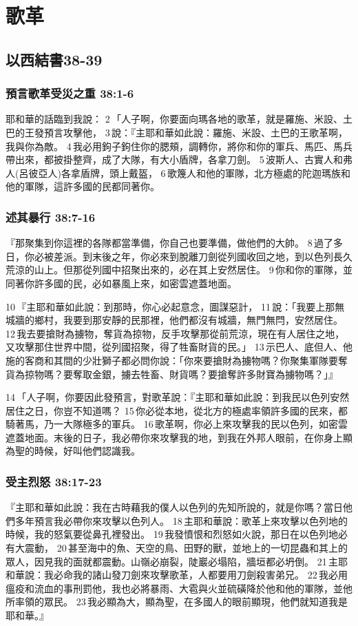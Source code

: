 \section{歌革}
\subsection{以西結書38-39}
\subsubsection{預言歌革受災之重 38:1-6}
耶和華的話臨到我說： 2 「人子啊，你要面向瑪各地的歌革，就是羅施、米設、土巴的王發預言攻擊他， 3 說：『主耶和華如此說：羅施、米設、土巴的王歌革啊，我與你為敵。 4 我必用鉤子鉤住你的腮頰，調轉你，將你和你的軍兵、馬匹、馬兵帶出來，都披掛整齊，成了大隊，有大小盾牌，各拿刀劍。 5 波斯人、古實人和弗人(呂彼亞人)各拿盾牌，頭上戴盔， 6 歌篾人和他的軍隊，北方極處的陀迦瑪族和他的軍隊，這許多國的民都同著你。

\subsubsection{述其暴行 38:7-16}
『那聚集到你這裡的各隊都當準備，你自己也要準備，做他們的大帥。 8 過了多日，你必被差派。到末後之年，你必來到脫離刀劍從列國收回之地，到以色列長久荒涼的山上。但那從列國中招聚出來的，必在其上安然居住。 9 你和你的軍隊，並同著你許多國的民，必如暴風上來，如密雲遮蓋地面。

10 『主耶和華如此說：到那時，你心必起意念，圖謀惡計， 11 說：「我要上那無城牆的鄉村，我要到那安靜的民那裡，他們都沒有城牆，無門無閂，安然居住。 12 我去要搶財為擄物，奪貨為掠物，反手攻擊那從前荒涼，現在有人居住之地，又攻擊那住世界中間，從列國招聚，得了牲畜財貨的民。」 13 示巴人、底但人、他施的客商和其間的少壯獅子都必問你說：「你來要搶財為擄物嗎？你聚集軍隊要奪貨為掠物嗎？要奪取金銀，擄去牲畜、財貨嗎？要搶奪許多財寶為擄物嗎？」』

14 「人子啊，你要因此發預言，對歌革說：『主耶和華如此說：到我民以色列安然居住之日，你豈不知道嗎？ 15 你必從本地，從北方的極處率領許多國的民來，都騎著馬，乃一大隊極多的軍兵。 16 歌革啊，你必上來攻擊我的民以色列，如密雲遮蓋地面。末後的日子，我必帶你來攻擊我的地，到我在外邦人眼前，在你身上顯為聖的時候，好叫他們認識我。



\subsubsection{受主烈怒 38:17-23}
『主耶和華如此說：我在古時藉我的僕人以色列的先知所說的，就是你嗎？當日他們多年預言我必帶你來攻擊以色列人。 18 主耶和華說：歌革上來攻擊以色列地的時候，我的怒氣要從鼻孔裡發出。 19 我發憤恨和烈怒如火說，那日在以色列地必有大震動， 20 甚至海中的魚、天空的鳥、田野的獸，並地上的一切昆蟲和其上的眾人，因見我的面就都震動。山嶺必崩裂，陡巖必塌陷，牆垣都必坍倒。 21 主耶和華說：我必命我的諸山發刀劍來攻擊歌革，人都要用刀劍殺害弟兄。 22 我必用瘟疫和流血的事刑罰他，我也必將暴雨、大雹與火並硫磺降於他和他的軍隊，並他所率領的眾民。 23 我必顯為大，顯為聖，在多國人的眼前顯現，他們就知道我是耶和華。』


